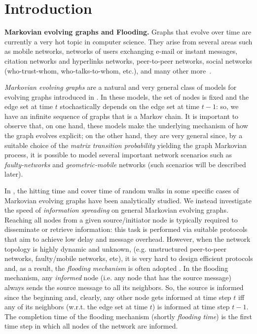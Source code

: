 \documentclass[10pt,a4paper]{article}
\begin{document}
\section{Introduction}
\textbf{Markovian evolving graphs and Flooding.} Graphs that evolve over time are currently a very hot topic in computer science. They arise from several areas such as mobile networks, networks of users exchanging e-mail or instant messages, citation networks and hyperlinks networks, peer-to-peer networks, social networks (who-trust-whom, who-talks-to-whom, etc.), and many other more~\cite{AKL08,BOOK05,CMPS07,OS07,HHL88,P87,Sh01}.


\emph{Markovian evolving graphs} are a natural and very general class of models for evolving graphs introduced in \cite{AKL08}. In these models, the set of nodes is fixed and the edge set at time $t$ stochastically depends on the edge set at time $t-1$: so, we have an infinite sequence of graphs that is a Markov chain. It is important to observe that, on one hand, these models make the underlying mechanism of how the graph evolves explicit; on the other hand, they are very general since, by a suitable choice of the \emph{matrix transition probability} yielding the graph Markovian process, it is possible to model several important network scenarios such as \emph{faulty-networks} and \emph{geometric-mobile} networks (such scenarios will be described later).

In \cite{AKL08}, the hitting time and cover time of random walks in some specific cases of Markovian evolving graphs have been analytically studied. We instead investigate the speed of \emph{information spreading} on general Markovian evolving graphs. Reaching all nodes from a given source/initiator node is typically required to disseminate or retrieve information: this task is performed via suitable protocols that aim to achieve low delay and message overhead. However, when the network topology is highly dynamic and unknown, (e.g. unstructured peer-to-peer networks, faulty/mobile networks, etc), it is very hard to design efficient protocols   and, as a result, the \emph{flooding mechanism} is often adopted \cite{CL05,GS05,G02,LCS02}. In the flooding mechanism, any \emph{informed} node (i.e. any node that has the source message) always sends the source message to all its neighbors. So, the source is informed since the beginning and, clearly, any other node gets informed at time step $t$ iff any of its neighbors (w.r.t. the edge set at time $t$) is informed at time step $t-1$. \\
The completion time of the flooding mechanism (shortly \emph{flooding time}) is the first time step in
which all nodes of the network are informed.
\end{document}
